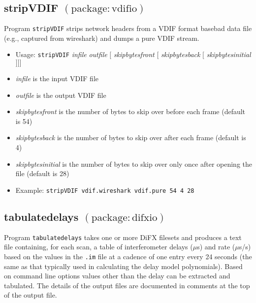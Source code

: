
\subsection{stripVDIF {\small $\mathrm{(package: vdifio)}$} \label{sec:stripVDIF}}

Program {\tt stripVDIF} strips network headers from a VDIF format basebad data file (e.g., captured from wireshark) and dumps a pure VDIF stream.

\begin{itemize}
\item[] Usage: {\tt stripVDIF} {\em infile} {\em outfile} $[$ {\em skipbytesfront} $[$ {\em skipbytesback} $[$ {\em skipbytesinitial} $] ] ]$

\item[] {\em infile} is the input VDIF file
\item[] {\em outfile} is the output VDIF file
\item[] {\em skipbytesfront} is the number of bytes to skip over before each frame (default is 54)
\item[] {\em skipbytesback} is the number of bytes to skip over after each frame (default is 4)
\item[] {\em skipbytesinitial} is the number of bytes to skip over only once after opening the file (default is 28)

\item[] Example: {\tt stripVDIF vdif.wireshark vdif.pure 54 4 28}
\end{itemize}







\subsection{tabulatedelays {\small $\mathrm{(package: difxio)}$}} \label{sec:tabulatedelays}

Program {\tt tabulatedelays} takes one or more DiFX filesets and produces a text file containing, for each scan, a table of interferometer delays ($\mu$s) and rate ($\mu$s/s) based on the values in the {\tt .im} file at a cadence of one entry every 24 seconds (the same as that typically used in calculating the delay model polynomials).
Based on command line options values other than the delay can be extracted and tabulated.
The details of the output files are documented in comments at the top of the output file.


